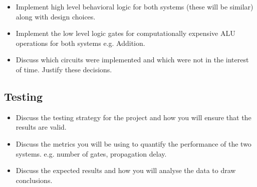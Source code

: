 \documentclass[12pt]{article}
\begin{document}
\begin{itemize}
    \item Implement high level behavioral logic for both systems (these will be similar) along with design choices.
    \item Implement the low level logic gates for computationally expensive ALU operations for both systems e.g. Addition.
    \item Discuss which circuits were implemented and which were not in the interest of time. Justify these decisions.
\end{itemize}

\subsection{Testing}

\begin{itemize}
    \item Discuss the testing strategy for the project and how you will ensure that the results are valid.
    \item Discuss the metrics you will be using to quantify the performance of the two systems. e.g. number of gates, propagation delay.
    \item Discuss the expected results and how you will analyse the data to draw conclusions.
\end{itemize}
\end{document}

